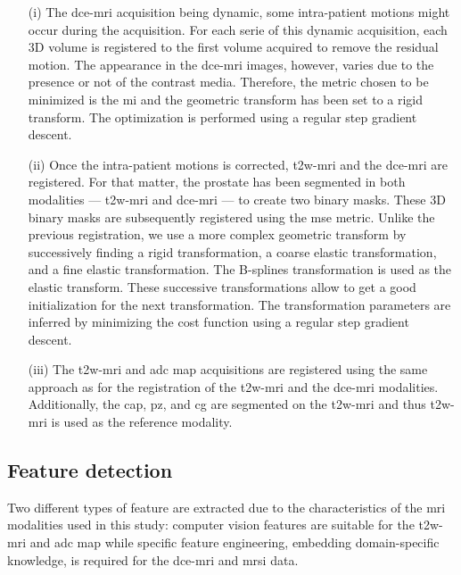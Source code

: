 \documentclass[final,3p,times,twocolumn]{elsarticle}
\begin{document}
\begin{itemize}

\item[(i)] The \ac{dce}-\ac{mri} acquisition being dynamic, some intra-patient
motions might occur during the acquisition. For each serie of this dynamic
acquisition, each 3D volume is registered to the first volume acquired to
remove the residual motion. The appearance in the \ac{dce}-\ac{mri} images,
however, varies due to the presence or not of the contrast media. Therefore,
the metric chosen to be minimized is the \ac{mi} and the geometric transform
has been set to a rigid transform. The optimization is performed using a
regular step gradient descent.

\item[(ii)] Once the intra-patient motions is corrected, \ac{t2w}-\ac{mri} and
the \ac{dce}-\ac{mri} are registered. For that matter, the prostate has been
segmented in both modalities --- \ac{t2w}-\ac{mri} and \ac{dce}-\ac{mri} --- to
create two binary masks. These 3D binary masks are subsequently
registered using the \ac{mse} metric. Unlike the previous registration, we use
a more complex geometric transform by successively finding a rigid
transformation, a coarse elastic transformation, and a fine elastic
transformation. The B-splines transformation is used as the elastic
transform. These successive transformations allow to get a good initialization
for the next transformation. The transformation parameters are inferred by
minimizing the cost function using a regular step gradient descent.

\item[(iii)] The \ac{t2w}-\ac{mri} and \ac{adc} map acquisitions are registered
using the same approach as for the registration of the \ac{t2w}-\ac{mri} and
the \ac{dce}-\ac{mri} modalities. Additionally, the \ac{cap}, \ac{pz}, and
\ac{cg} are segmented on the \ac{t2w}-\ac{mri} and thus \ac{t2w}-\ac{mri} is
used as the reference modality.

\end{itemize}

\subsection{Feature detection}

Two different types of feature are extracted due to the characteristics of the
\ac{mri} modalities used in this study: computer vision features are
suitable for the \ac{t2w}-\ac{mri} and \ac{adc} map while specific feature
engineering, embedding domain-specific knowledge, is required for the
\ac{dce}-\ac{mri} and \ac{mrsi} data.
\end{document}
